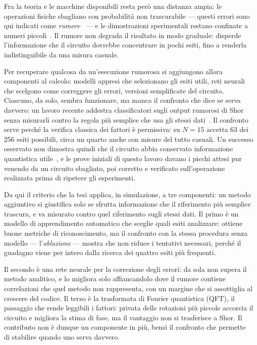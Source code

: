 Fra la teoria e le macchine disponibili resta però una distanza ampia: le
operazioni fisiche sbagliano con probabilità non trascurabile --- questi errori
sono qui indicati come \emph{rumore}~\cite{preskill2018} --- e le dimostrazioni
sperimentali restano confinate a numeri piccoli~\cite{skosana2021}.
Il rumore non degrada il risultato in modo graduale: disperde l'informazione che
il circuito dovrebbe concentrare in pochi esiti, fino a renderla indistinguibile
da una misura casuale.

Per recuperare qualcosa da un'esecuzione rumorosa si aggiungono allora componenti
al calcolo: modelli appresi che selezionano gli esiti utili, reti neurali che
scelgono come correggere gli errori, versioni semplificate del circuito.
Ciascuno, da solo, sembra funzionare, ma manca il confronto che dice se serva
davvero: un lavoro recente addestra classificatori sugli output rumorosi di Shor
senza misurarli contro la regola più semplice che usa gli stessi
dati~\cite{yang2026}.
Il confronto serve perché la verifica classica dei fattori è permissiva: su
$N=15$ accetta 63 dei 256 esiti possibili, circa un quarto anche con misure del
tutto casuali.
Un successo osservato non dimostra quindi che il circuito abbia conservato
informazione quantistica utile~\cite{smolin2013}, e le prove iniziali di questo lavoro davano i
picchi attesi pur venendo da un circuito sbagliato, poi corretto e verificato
sull'operazione realizzata prima di ripetere gli esperimenti.

Da qui il criterio che la tesi applica, in simulazione, a tre componenti: un
metodo aggiuntivo si giustifica solo se sfrutta informazione che il riferimento
più semplice trascura, e va misurato contro quel riferimento sugli stessi dati.
Il primo è un modello di apprendimento automatico che sceglie quali esiti
analizzare: ottiene buone metriche di riconoscimento, ma il confronto con la
stessa procedura senza modello --- l'\emph{ablazione} --- mostra che non riduce i
tentativi necessari, perché il guadagno viene per intero dalla ricerca dei
quattro esiti più frequenti.

Il secondo è una rete neurale per la correzione degli errori: da sola non supera
il metodo analitico, e lo migliora solo affiancandolo dove il rumore contiene
correlazioni che quel metodo non rappresenta, con un margine che si assottiglia
al crescere del codice.
Il terzo è la trasformata di Fourier quantistica (QFT), il passaggio che rende
leggibili i fattori: privata delle rotazioni più piccole accorcia il circuito e
migliora la stima di fase, ma il vantaggio non si trasferisce a Shor.
Il contributo non è dunque un componente in più, bensì il confronto che permette
di stabilire quando uno serva davvero.

